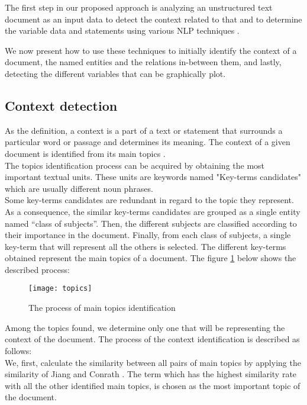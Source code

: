 The first step in our proposed approach is analyzing an unstructured text document as an input data to detect the context related to that and to determine the variable data and statements using various NLP techniques \cite{maha}.   

We now present how to use these techniques to initially identify the context of a document, the named entities and the relations in-between them, and lastly, detecting the different variables that can be graphically plot. 



\subsection{Context detection}
\label{sec_21}

As the definition, a context is a part of a text or statement that surrounds a particular word or passage and determines its meaning. The context of a given document is identified from its main topics \cite{maha}. \\
The topics identification process can be acquired by obtaining the most important textual units. These units are keywords named "Key-terms candidates" which are usually different noun phrases.   \\
Some key-terms candidates are redundant in regard to the topic they represent. As a consequence, the similar key-terms candidates are grouped as a single entity named “class of subjects”. Then, the different subjects are classified according to their importance in the document. Finally, from each class of subjects, a single key-term that will represent all the others is selected. The different key-terms obtained represent the main topics of a document. The figure \ref{fig_topics} below shows the described process:

\bigskip

\begin{figure}[H]
\centering
\texttt{[image: topics]}
\caption{The process of main topics identification }
\label{fig_topics}
\end{figure}

Among the topics found, we determine only one that will be representing the context of the document. The process of the context identification is described as follows: \\ 
We, first, calculate the similarity between all pairs of main topics by applying the similarity of Jiang and Conrath \cite{jiang}. The term which has the highest similarity rate with all the other identified main topics, is chosen as the most important topic of the document. \\

